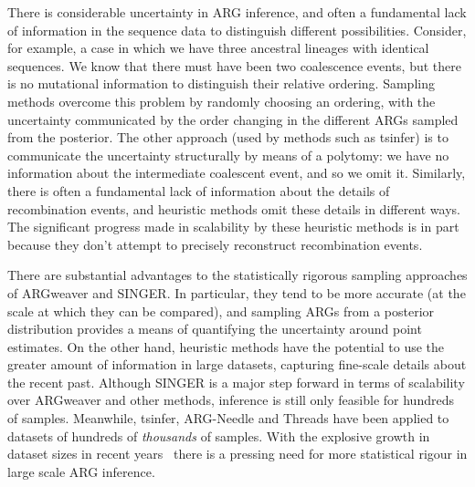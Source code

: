 \documentclass{article}
\begin{document}
There is considerable uncertainty in ARG inference, and often a fundamental
lack of information in the sequence data to distinguish different
possibilities. Consider, for example, a case in which we have three
ancestral lineages with identical sequences. We know that there
must have been two coalescence events, but there is no mutational information to
distinguish their relative ordering. Sampling methods overcome this problem
by randomly choosing an ordering, with the uncertainty communicated by the order
changing in the different ARGs sampled from the posterior.
The other approach (used by methods such as tsinfer) is to communicate
the uncertainty structurally by means of a polytomy: we have no
information about the intermediate coalescent event, and so we omit it.
Similarly, there is often a fundamental lack of information about the
details of recombination events, and heuristic methods
omit these details in different ways. 
The significant progress made in
scalability by these heuristic methods is in part because they don't
attempt to precisely reconstruct recombination events.

There are substantial advantages to the statistically rigorous sampling
approaches of ARGweaver and SINGER.
In particular, they tend to be more accurate (at the
scale at which they can be compared),
and sampling ARGs from a
posterior distribution provides a means of quantifying the uncertainty
around point estimates. 
On the other hand, heuristic methods have the potential
to use the greater amount of information in large datasets,
capturing fine-scale details about the recent past.
Although SINGER is a major step forward
in terms of scalability over ARGweaver and other methods, inference is still
only feasible for hundreds of samples.  
Meanwhile, tsinfer, ARG-Needle and Threads have
been applied to datasets of hundreds of \emph{thousands} of samples.
With the explosive growth in dataset
sizes in recent years~\citep{caulfield2017national,turnbull2018100,
bycroft2018genome,backman2021exome,halldorsson2022sequences,uk2023whole,
all2024genomic,stark2024call,cook2025our}
there is a pressing need for more statistical
rigour in large scale ARG inference.
\end{document}
